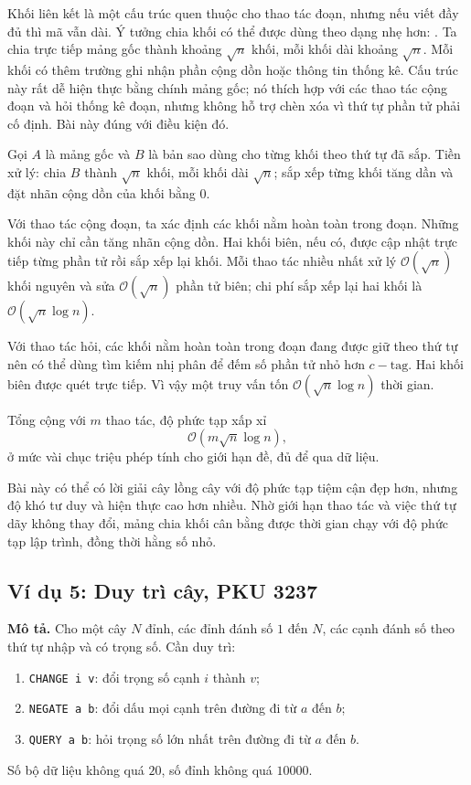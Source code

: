 \documentclass[11pt]{article}
\newcommand{\Oh}{\mathcal{O}}
\begin{document}
Khối liên kết là một cấu trúc quen thuộc cho thao tác đoạn, nhưng nếu viết
đầy đủ thì mã vẫn dài. Ý tưởng chia khối có thể được dùng theo dạng nhẹ hơn:
. Ta chia trực tiếp mảng gốc thành khoảng
\(\sqrt n\) khối, mỗi khối dài khoảng \(\sqrt n\). Mỗi khối có thêm trường
ghi nhận phần cộng dồn hoặc thông tin thống kê. Cấu trúc này rất dễ hiện
thực bằng chính mảng gốc; nó thích hợp với các thao tác cộng đoạn và hỏi
thống kê đoạn, nhưng không hỗ trợ chèn xóa vì thứ tự phần tử phải cố định.
Bài này đúng với điều kiện đó.

Gọi \(A\) là mảng gốc và \(B\) là bản sao dùng cho từng khối theo thứ tự đã
sắp. Tiền xử lý: chia \(B\) thành \(\sqrt n\) khối, mỗi khối dài
\(\sqrt n\); sắp xếp từng khối tăng dần và đặt nhãn cộng dồn của khối bằng
\(0\).

Với thao tác cộng đoạn, ta xác định các khối nằm hoàn toàn trong đoạn. Những
khối này chỉ cần tăng nhãn cộng dồn. Hai khối biên, nếu có, được cập nhật
trực tiếp từng phần tử rồi sắp xếp lại khối. Mỗi thao tác nhiều nhất xử lý
\(\Oh(\sqrt n)\) khối nguyên và sửa \(\Oh(\sqrt n)\) phần tử biên; chi phí
sắp xếp lại hai khối là \(\Oh(\sqrt n\log n)\).

Với thao tác hỏi, các khối nằm hoàn toàn trong đoạn đang được giữ theo thứ
tự nên có thể dùng tìm kiếm nhị phân để đếm số phần tử nhỏ hơn
\(c-\text{tag}\). Hai khối biên được quét trực tiếp. Vì vậy một truy vấn
tốn \(\Oh(\sqrt n\log n)\) thời gian.

Tổng cộng với \(m\) thao tác, độ phức tạp xấp xỉ
\[
  \Oh(m\sqrt n\log n),
\]
ở mức vài chục triệu phép tính cho giới hạn đề, đủ để qua dữ liệu.

Bài này có thể có lời giải cây lồng cây với độ phức tạp tiệm cận đẹp hơn,
nhưng độ khó tư duy và hiện thực cao hơn nhiều. Nhờ giới hạn thao tác và
việc thứ tự dãy không thay đổi, mảng chia khối cân bằng được thời gian chạy
với độ phức tạp lập trình, đồng thời hằng số nhỏ.

\subsection{Ví dụ 5: Duy trì cây, PKU 3237}

\textbf{Mô tả.} Cho một cây \(N\) đỉnh, các đỉnh đánh số \(1\) đến \(N\),
các cạnh đánh số theo thứ tự nhập và có trọng số. Cần duy trì:
\begin{enumerate}
  \item \texttt{CHANGE i v}: đổi trọng số cạnh \(i\) thành \(v\);
  \item \texttt{NEGATE a b}: đổi dấu mọi cạnh trên đường đi từ \(a\) đến
  \(b\);
  \item \texttt{QUERY a b}: hỏi trọng số lớn nhất trên đường đi từ \(a\) đến
  \(b\).
\end{enumerate}
Số bộ dữ liệu không quá \(20\), số đỉnh không quá \(10000\).
\end{document}
